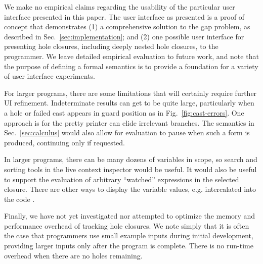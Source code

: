 
We make no empirical claims regarding the usability of the particular user interface presented in this paper. The \Hazel user interface as presented is a proof of concept
that demonstrates (1) a comprehensive solution to the gap problem, as described in Sec.~\ref{sec:implementation}; and 
(2) one possible user interface for presenting hole closures, including deeply nested hole closures, to the programmer. We leave detailed empirical evaluation to future work, and note that the purpose of defining a formal semantics is to provide a foundation for a variety of user interface experiments.

For larger programs, there are some limitations that will certainly require further UI refinement. 
Indeterminate results can get to be quite large, particularly when a hole or failed cast
appears in guard position as in Fig.~\ref{fig:cast-errors}. 
One approach is for the pretty printer can elide irrelevant branches. The semantics in Sec.~\ref{sec:calculus} would also allow for evaluation to pause when such
a form is produced, continuing only if requested. 

In larger programs, there can be many dozens of variables in scope, so search and sorting tools in the live context inspector would be useful. It would also be useful
to support the evaluation of arbitrary ``watched'' expressions in the selected 
closure. There are other ways to display the variable values, e.g. intercalated
into the code \cite{DBLP:journals/corr/abs-1806-07449,lamdu}.

Finally, we have not yet investigated nor attempted to optimize the memory and performance overhead of tracking hole closures. We note simply that it is often the case that 
programmers use small example inputs during initial development, providing larger inputs
only after the program is complete. There is no run-time overhead when there are no holes remaining.


